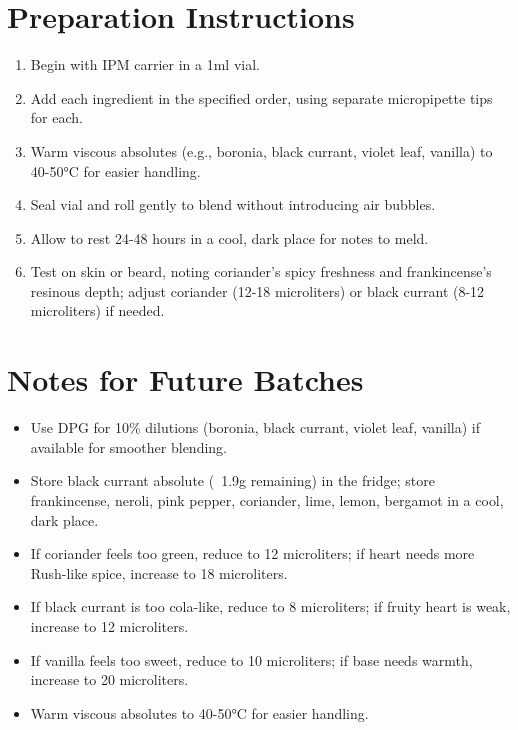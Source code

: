 \documentclass{article}
\begin{document}
\section*{Preparation Instructions}
\begin{enumerate}
  \item Begin with IPM carrier in a 1ml vial.
  \item Add each ingredient in the specified order, using separate micropipette tips for each.
  \item Warm viscous absolutes (e.g., boronia, black currant, violet leaf, vanilla) to 40-50°C for easier handling.
  \item Seal vial and roll gently to blend without introducing air bubbles.
  \item Allow to rest 24-48 hours in a cool, dark place for notes to meld.
  \item Test on skin or beard, noting coriander’s spicy freshness and frankincense’s resinous depth; adjust coriander (12-18 microliters) or black currant (8-12 microliters) if needed.
\end{enumerate}

\section*{Notes for Future Batches}
\begin{itemize}
  \item Use DPG for 10\% dilutions (boronia, black currant, violet leaf, vanilla) if available for smoother blending.
  \item Store black currant absolute (~1.9g remaining) in the fridge; store frankincense, neroli, pink pepper, coriander, lime, lemon, bergamot in a cool, dark place.
  \item If coriander feels too green, reduce to 12 microliters; if heart needs more Rush-like spice, increase to 18 microliters.
  \item If black currant is too cola-like, reduce to 8 microliters; if fruity heart is weak, increase to 12 microliters.
  \item If vanilla feels too sweet, reduce to 10 microliters; if base needs warmth, increase to 20 microliters.
  \item Warm viscous absolutes to 40-50°C for easier handling.
\end{itemize}
\end{document}
